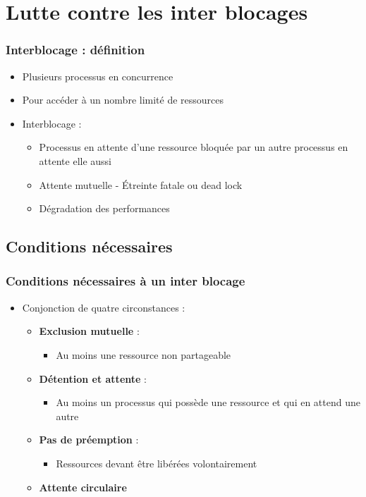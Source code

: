 \section{Lutte contre les inter blocages}

\begin{frame}
\frametitle{Interblocage : définition}
\begin{itemize}
\item Plusieurs processus en concurrence
\item Pour accéder à un nombre limité de ressources
\item Interblocage :
\begin{itemize}
\item Processus en attente d’une ressource bloquée par un autre processus en attente elle aussi
\item Attente mutuelle - Étreinte fatale ou dead lock
\item Dégradation des performances
\end{itemize}
\end{itemize}
\end{frame}

\subsection{Conditions nécessaires}
\begin{frame}
\frametitle{Conditions nécessaires à un inter blocage}
\begin{itemize}
\item Conjonction de quatre circonstances :
\begin{itemize}
\item \textbf{Exclusion mutuelle} :
\begin{itemize}
\item Au moins une ressource non partageable
\end{itemize}
\item \textbf{Détention et attente} :
\begin{itemize}
\item Au moins un processus qui possède une ressource et qui en attend une autre
\end{itemize}
\item \textbf{Pas de préemption} :
\begin{itemize}
\item Ressources devant être libérées volontairement
\end{itemize}
\item \textbf{Attente circulaire}
\end{itemize}
\end{itemize}
\end{frame}

